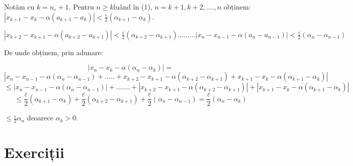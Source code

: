 \documentclass[a4paper,12pt,oneside]{report}
\begin{document}
Notăm cu \(k=n_{\varepsilon }+1\). Pentru \(n\geq k \)luând în (1), \(n= k+1, k+2,....,n\) obținem:
\(\left | x_{k+1} - x_{k} - \alpha \left ( a_{k+1}- a_{k} \right ) \right |< \frac{\varepsilon }{2}\left ( \alpha _{k+1} - \alpha _{k} \right )\). 

\(\left | x_{k+2} - x_{k+1} - \alpha \left ( a_{k+2}- a_{k+1} \right ) \right |< \frac{\varepsilon }{2}\left ( \alpha _{k+2} - \alpha _{k+1} \right )
...
...
...
\left | x_{n} - x_{n-1} - \alpha \left ( a_{n}- a_{n-1} \right ) \right |< \frac{\varepsilon }{2}\left ( \alpha _{n} - \alpha _{n-1} \right )\)

De unde obținem, prin adunare:

\begin{displaymath}
  \left | x_{n} - x_{k} - \alpha \left ( \alpha _{n}-\alpha _{k} \right ) \right |= 
\end{displaymath}
\begin{displaymath}
  \left | x_{n} - x_{n-1} -\alpha \left ( \alpha _{n}-\alpha _{n-1} \right )+.....+x_{k+2}-x_{k+1}-\alpha \left ( \alpha _{k+2}-\alpha _{k+1} \right )  +x_{k+1}-x_{k}-\alpha \left ( \alpha _{k+1}-\alpha _{k} \right )\right |
\end{displaymath}
\begin{displaymath}
  \leq \left | x_{n}-x_{n-1}-\alpha \left ( \alpha _{n}-\alpha _{n-1} \right ) \right |+.......+\left | x_{k+2}-x_{k+1}-\alpha \left ( \alpha _{k+2}-\alpha _{k+1} \right ) \right |+\left | x_{k+1}-x_{k}- \alpha \left ( \alpha _{k+1}-\alpha _{k} \right ) \right |
\end{displaymath}
\begin{displaymath}
  \leq \frac{\varepsilon }{2}\left ( \alpha _{k+1} -\alpha _{k} \right )+\frac{\varepsilon }{2}\left ( \alpha _{k+2}-\alpha _{k+1} \right )+\frac{\varepsilon }{2}\left ( \alpha _{n}- \alpha _{n-1}\right )= \frac{\varepsilon }{2}\left ( \alpha _{n}-\alpha _{k} \right )
\end{displaymath}

\(\leq \frac{\varepsilon }{2}\alpha _{n}\) deoarece \(\alpha _{k}> 0\). 


\section{Exerciții}
\end{document}
